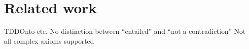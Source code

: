 \documentclass[paper.tex]{subfiles}
\begin{document}
\section{Related work}
\label{sec:related}

\begin{todos}
  \todo TDDOnto etc.
  \todo No distinction between ``entailed'' and ``not a contradiction''
  \todo Not all complex axioms supported
\end{todos}
\end{document}
